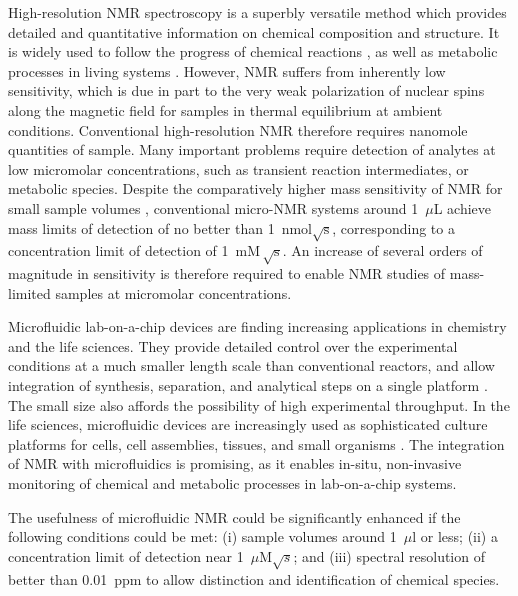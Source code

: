  High-resolution NMR
 spectroscopy is a superbly versatile method which provides detailed and
 quantitative information on chemical composition and structure. It is widely
 used to follow the progress of chemical reactions
 \cite{Foley-quantitative:2004bk,Foley:2014kpa},
 as well as
 metabolic processes in living systems
 \cite{Wishart:2008ga,Gottschalk:2008ixa,CuperlovicCulf:2010vc,Shintu:2012bl}.
 However, NMR suffers from inherently low sensitivity,
 which is due in part to the very weak polarization of nuclear spins along the magnetic
 field for samples in thermal equilibrium at ambient conditions.
 Conventional high-resolution NMR therefore requires nanomole quantities of
 sample. Many important problems require detection of analytes at low
 micromolar concentrations, such as transient reaction intermediates, or
 metabolic species. Despite the
 comparatively higher mass sensitivity of NMR for small sample volumes
 \cite{Olson:1995vu,Bart:2009kc}, conventional micro-NMR systems  around
 1~$\mu$L achieve mass limits of detection of no better than\cite{Finch:2016gv}
 1~nmol$\sqrt{\mathrm{s}}$,  corresponding to a concentration
 limit of detection of 1~$\mathrm{m M \, \sqrt{s}}$. An increase of several
 orders of magnitude in sensitivity is therefore required to enable NMR
 studies of mass-limited samples at micromolar concentrations.

 Microfluidic lab-on-a-chip devices are finding increasing applications in
 chemistry and the
 life sciences. They provide detailed control over the experimental
 conditions at a much smaller length scale than conventional reactors, and
 allow integration of synthesis, separation, and analytical steps on
 a single platform \cite{Wang:2006en,Theberge:2012iq,Hoang:2011du,Ohno:2008da,Zhou:2004id,
 Fang:2018ib,Hoang:2011ee,Gunther:2006vd}. The small size also affords the possibility of
 high experimental throughput.
 In the life sciences, microfluidic devices are increasingly used as
 sophisticated culture platforms for cells,
 cell assemblies, tissues, and small organisms
 \cite{Manz:1990vc,Whitesides:2006vi,
 ElAli:2006ci,West:2008jd,Neuzil:2012gc,Gracz:2015co}.
 The integration of NMR with microfluidics
 \cite{Ryan:2012ke,Badilita:2011td,Spengler:2014ir,Finch:2016gv} is promising, as
 it enables in-situ, non-invasive monitoring of chemical and metabolic processes
 in lab-on-a-chip systems.

 The usefulness of microfluidic NMR could be significantly
 enhanced if the following conditions could be met:
 (i) sample volumes around 1~$\mu$l or less;
 (ii) a concentration limit of
 detection near  1~$\mu$M$\sqrt{s}$; and
 (iii)  spectral
 resolution of better than 0.01~ppm to allow distinction and identification
 of chemical species.

